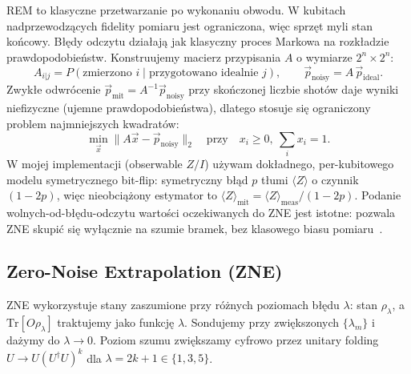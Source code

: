 \documentclass[11pt,a4paper]{article}
\begin{document}
REM to klasyczne przetwarzanie po wykonaniu obwodu. W kubitach nadprzewodzących fidelity
pomiaru jest ograniczona, więc sprzęt myli stan końcowy. Błędy odczytu działają
jak klasyczny proces Markowa na rozkładzie prawdopodobieństw. Konstruujemy macierz
przypisania $A$ o wymiarze $2^n\times 2^n$:
\begin{equation}
A_{i|j} = P(\text{zmierzono } i \mid \text{przygotowano idealnie } j),
\qquad \vec{p}_{\text{noisy}} = A\,\vec{p}_{\text{ideal}}.
\end{equation}
Zwykłe odwrócenie $\vec{p}_{\text{mit}} = A^{-1}\vec{p}_{\text{noisy}}$ przy skończonej
liczbie shotów daje wyniki niefizyczne (ujemne prawdopodobieństwa), dlatego stosuje się
ograniczony problem najmniejszych kwadratów:
\begin{equation}
\min_{\vec{x}} \|A\vec{x} - \vec{p}_{\text{noisy}}\|_2
\quad \text{przy} \quad x_i \ge 0,\ \textstyle\sum_i x_i = 1.
\end{equation}
W mojej implementacji (obserwable $Z/I$) używam dokładnego, per-kubitowego modelu
symetrycznego bit-flip: symetryczny błąd $p$ tłumi $\langle Z\rangle$ o czynnik $(1-2p)$,
więc nieobciążony estymator to
$\langle Z\rangle_{\text{mit}} = \langle Z\rangle_{\text{meas}}/(1-2p)$.
Podanie wolnych-od-błędu-odczytu wartości oczekiwanych do ZNE jest istotne: pozwala ZNE
skupić się wyłącznie na szumie bramek, bez klasowego biasu pomiaru~\cite{koh2024,cai2023}.

\subsection{Zero-Noise Extrapolation (ZNE)}

ZNE wykorzystuje stany zaszumione przy różnych poziomach błędu $\lambda$: stan $\rho_\lambda$,
a $\mathrm{Tr}[O\rho_\lambda]$ traktujemy jako funkcję $\lambda$. Sondujemy przy zwiększonych
$\{\lambda_m\}$ i dażymy do $\lambda\to 0$. Poziom szumu zwiększamy cyfrowo przez
unitary folding $U \to U(U^{\dagger}U)^k$ dla $\lambda = 2k+1 \in \{1,3,5\}$.
\end{document}
